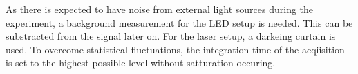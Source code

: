 As there is expected to have noise from external light sources during the experiment, a background measurement for the LED setup is needed.
This can be substracted from the signal later on.
For the laser setup, a darkeing curtain is used. 
To overcome statistical fluctuations, the integration time of the acqiisition is set to the highest possible level without satturation occuring.

